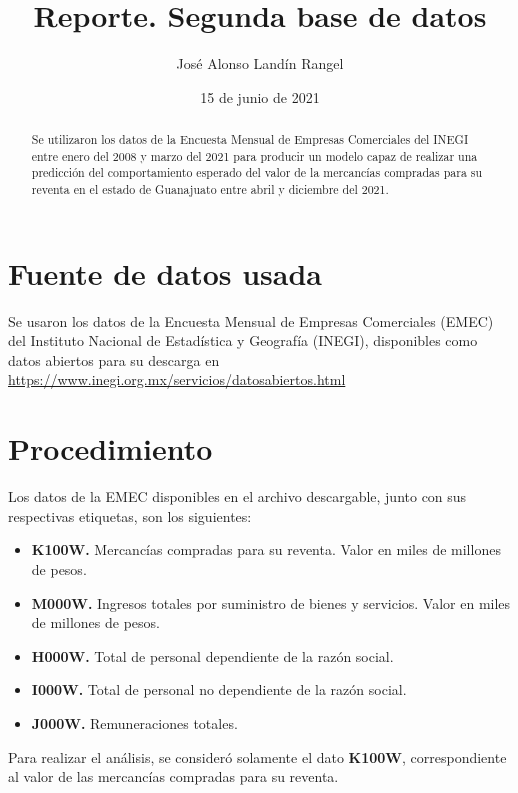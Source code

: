 \documentclass[twocolumn]{article}
\title{\textbf{Reporte. Segunda base de datos}}
\author{José Alonso Landín Rangel}
\date{15 de junio de 2021}
\begin{document}
\maketitle

\begin{abstract}
    Se utilizaron los datos de la Encuesta Mensual de Empresas Comerciales del INEGI entre enero del 2008 y marzo del 2021 para producir un modelo capaz de realizar una predicción del comportamiento esperado del valor de la mercancías compradas para su reventa en el estado de Guanajuato entre abril y diciembre del 2021.
\end{abstract}

\section{Fuente de datos usada}


Se usaron los datos de la Encuesta Mensual de Empresas Comerciales (EMEC) del Instituto Nacional de Estadística y Geografía (INEGI), disponibles como datos abiertos para su descarga en \url{https://www.inegi.org.mx/servicios/datosabiertos.html}

\section{Procedimiento}

Los datos de la EMEC disponibles en el archivo descargable, junto con sus respectivas etiquetas, son los siguientes:

\begin{itemize}
    \item \textbf{K100W.} Mercancías compradas para su reventa. Valor en miles de millones de pesos.
    \item \textbf{M000W.} Ingresos totales por suministro de bienes y servicios. Valor en miles de millones de pesos.
    \item \textbf{H000W.} Total de personal dependiente de la razón social.
    \item \textbf{I000W.} Total de personal no dependiente de la razón social.
    \item \textbf{J000W.} Remuneraciones totales.
\end{itemize}

Para realizar el análisis, se consideró solamente el dato \textbf{K100W}, correspondiente al valor de las mercancías compradas para su reventa.\hfill\\

\medskip
\end{document}
